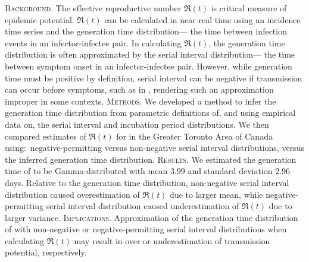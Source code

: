 \textsc{Background}.
The effective reproductive number $\Re(t)$
is critical measure of epidemic potential.
$\Re(t)$ can be calculated in near real time
using an incidence time series and the generation time distribution---%
the time between infection events in an infector-infectee pair.
In calculating $\Re(t)$, the generation time distribution
is often approximated by the serial interval distribution---%
the time between symptom onset in an infector-infectee pair.
However, while generation time must be positive by definition,
serial interval can be negative if transmission can occur before symptoms,
such as in \covid, rendering such an approximation improper in some contexts.
\textsc{Methods}.
We developed a method to infer the generation time distribution
from parametric definitions of, and using empirical data on,
the serial interval and incubation period distributions.
We then compared estimates of $\Re(t)$ for \covid in
the Greater Toronto Area of Canada using:\
negative-permitting versus non-negative serial interval distributions,
versus the inferred generation time distribution.
\textsc{Results}.
We estimated the generation time of \covid to be
Gamma-distributed with mean $3.99$ and standard deviation $2.96$ days.
Relative to the generation time distribution,
non-negative serial interval distribution caused overestimation of $\Re(t)$
due to larger mean, while
negative-permitting serial interval distribution caused underestimation of $\Re(t)$
due to larger variance.
\textsc{Implications}.
Approximation of the generation time distribution of \covid
with non-negative or negative-permitting serial interval distributions
when calculating $\Re(t)$ may result in over or underestimation of
transmission potential, respectively.